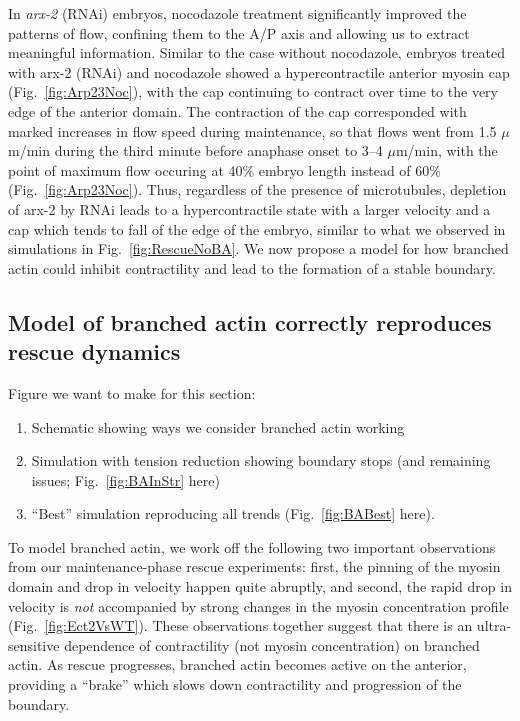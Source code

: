 \documentclass[11pt]{article}
\newcommand{\red}[1]{\color{red}#1\normalcolor}
\newcommand{\6}[1]{#1_{\text{6}}}
\newcommand{\3}[1]{#1_{\text{3}}}
\begin{document}
In \emph{arx-2} (RNAi) embryos, nocodazole treatment significantly improved the patterns of flow, confining them to the A/P axis and allowing us to extract meaningful information. Similar to the case without nocodazole, embryos treated with arx-2 (RNAi) and nocodazole showed a hypercontractile anterior myosin cap (Fig.\ \ref{fig:Arp23Noc}), with the cap continuing to contract over time to the very edge of the anterior domain. The contraction of the cap corresponded with marked increases in flow speed during maintenance, so that flows went from 1.5 $\mu$m/min during the third minute before anaphase onset to 3--4 $\mu$m/min, with the point of maximum flow occuring at 40\% embryo length instead of 60\% (Fig.\ \ref{fig:Arp23Noc}). Thus, regardless of the presence of microtubules, depletion of arx-2 by RNAi leads to a hypercontractile state with a larger velocity and a cap which tends to fall of the edge of the embryo, similar to what we observed in simulations in Fig.\ \ref{fig:RescueNoBA}. We now propose a model for how branched actin could inhibit contractility and lead to the formation of a stable boundary.

\subsection{Model of branched actin correctly reproduces rescue dynamics}
\red{Figure we want to make for this section:
\begin{enumerate}[label=(\alph*),topsep=0pt,itemsep=-2ex]
\item Schematic showing ways we consider branched actin working
\item Simulation with tension reduction showing boundary stops (and remaining issues; Fig.\ \ref{fig:BAInStr} here)
\item ``Best'' simulation reproducing all trends (Fig.\ \ref{fig:BABest} here).
\end{enumerate}
}


To model branched actin, we work off the following two important observations from our maintenance-phase rescue experiments: first, the pinning of the myosin domain and drop in velocity happen quite abruptly, and second, the rapid drop in velocity is \emph{not} accompanied by strong changes in the myosin concentration profile (Fig.\ \ref{fig:Ect2VsWT}). These observations together suggest that there is an ultra-sensitive dependence of contractility (not myosin concentration) on branched actin. As rescue progresses, branched actin becomes active on the anterior, providing a ``brake'' which slows down contractility and progression of the boundary.
\end{document}
